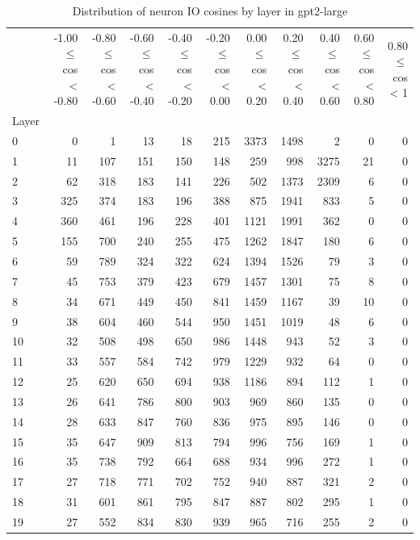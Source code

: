\begin{table}
\caption{Distribution of neuron IO cosines by layer in gpt2-large}
\label{tab:gpt2-large_half_coarse}
\begin{tabular}{lrrrrrrrrrr}
 & -1.00 $\leq$ cos < -0.80 & -0.80 $\leq$ cos < -0.60 & -0.60 $\leq$ cos < -0.40 & -0.40 $\leq$ cos < -0.20 & -0.20 $\leq$ cos < 0.00 & 0.00 $\leq$ cos < 0.20 & 0.20 $\leq$ cos < 0.40 & 0.40 $\leq$ cos < 0.60 & 0.60 $\leq$ cos < 0.80 & 0.80 $\leq$ cos < 1 \\
Layer &  &  &  &  &  &  &  &  &  &  \\
0 & 0 & 1 & 13 & 18 & 215 & 3373 & 1498 & 2 & 0 & 0 \\
1 & 11 & 107 & 151 & 150 & 148 & 259 & 998 & 3275 & 21 & 0 \\
2 & 62 & 318 & 183 & 141 & 226 & 502 & 1373 & 2309 & 6 & 0 \\
3 & 325 & 374 & 183 & 196 & 388 & 875 & 1941 & 833 & 5 & 0 \\
4 & 360 & 461 & 196 & 228 & 401 & 1121 & 1991 & 362 & 0 & 0 \\
5 & 155 & 700 & 240 & 255 & 475 & 1262 & 1847 & 180 & 6 & 0 \\
6 & 59 & 789 & 324 & 322 & 624 & 1394 & 1526 & 79 & 3 & 0 \\
7 & 45 & 753 & 379 & 423 & 679 & 1457 & 1301 & 75 & 8 & 0 \\
8 & 34 & 671 & 449 & 450 & 841 & 1459 & 1167 & 39 & 10 & 0 \\
9 & 38 & 604 & 460 & 544 & 950 & 1451 & 1019 & 48 & 6 & 0 \\
10 & 32 & 508 & 498 & 650 & 986 & 1448 & 943 & 52 & 3 & 0 \\
11 & 33 & 557 & 584 & 742 & 979 & 1229 & 932 & 64 & 0 & 0 \\
12 & 25 & 620 & 650 & 694 & 938 & 1186 & 894 & 112 & 1 & 0 \\
13 & 26 & 641 & 786 & 800 & 903 & 969 & 860 & 135 & 0 & 0 \\
14 & 28 & 633 & 847 & 760 & 836 & 975 & 895 & 146 & 0 & 0 \\
15 & 35 & 647 & 909 & 813 & 794 & 996 & 756 & 169 & 1 & 0 \\
16 & 35 & 738 & 792 & 664 & 688 & 934 & 996 & 272 & 1 & 0 \\
17 & 27 & 718 & 771 & 702 & 752 & 940 & 887 & 321 & 2 & 0 \\
18 & 31 & 601 & 861 & 795 & 847 & 887 & 802 & 295 & 1 & 0 \\
19 & 27 & 552 & 834 & 830 & 939 & 965 & 716 & 255 & 2 & 0 \\

\end{tabular}
\end{table}
